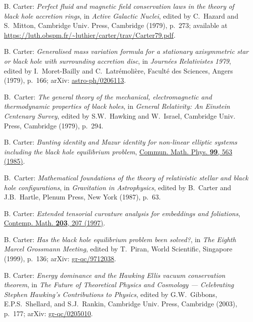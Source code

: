 \begin{thebibliography}{123}
B. Carter:
{\em Perfect fluid and magnetic field conservation laws in the theory of black hole accretion rings},
in {\em Active Galactic Nuclei}, edited by C.~Hazard and S.~Mitton,
Cambridge Univ. Press, Cambridge (1979), p.~273; available at
\url{https://luth.obspm.fr/~luthier/carter/trav/Carter79.pdf}.

B. Carter:
{\em Generalised mass variation formula for a stationary axisymmetric star or black hole with surrounding accretion disc},
in {\em Journées Relativistes 1979}, edited by  I.~Moret-Bailly and C.~Latrémolière,
Faculté des Sciences, Angers (1979), p.~166;
arXiv: \href{https://arxiv.org/abs/astro-ph/0206113}{astro-ph/0206113}.

B.~Carter:
{\em The general theory of the mechanical, electromagnetic and thermodynamic properties of black holes}, in {\em General Relativity: An Einstein Centenary Survey},
edited by S.W.~Hawking and W.~Israel,
Cambridge Univ. Press, Cambridge (1979), p.~294.

B. Carter:
{\em Bunting identity and Mazur identity for non-linear elliptic systems including the black hole equilibrium problem},
\href{https://doi.org/10.1007/BF01215910}{Commun. Math. Phys. {\bf 99}, 563 (1985)}.

B.~Carter:
{\em Mathematical foundations of the theory of
relativistic stellar and black hole configurations},
in {\em Gravitation in Astrophysics}, edited by B.~Carter and J.B.~Hartle,
Plenum Press, New York (1987), p.~63.

B. Carter:
{\em Extended tensorial curvature analysis for embeddings and foliations},
\href{http://dx.doi.org/10.1090/conm/203}{Contemp. Math. {\bf 203}, 207 (1997)}.

B. Carter: {\em Has the black hole equilibrium problem been solved?},
in {\em The Eighth Marcel Grossmann Meeting}, edited by T.~Piran,
World Scientific, Singapore (1999), p.~136;
arXiv: \href{https://arxiv.org/abs/gr-qc/9712038}{gr-qc/9712038}.

B. Carter: {\em Energy dominance and the Hawking Ellis vacuum conservation theorem},
in {\em The Future of Theoretical Physics and Cosmology ---
Celebrating Stephen Hawking's Contributions to Physics}, edited by G.W.~Gibbons, E.P.S.~Shellard,
and S.J.~Rankin,
Cambridge Univ. Press, Cambridge (2003), p.~177;
arXiv: \href{https://arxiv.org/abs/gr-qc/0205010}{gr-qc/0205010}.


\end{thebibliography}
